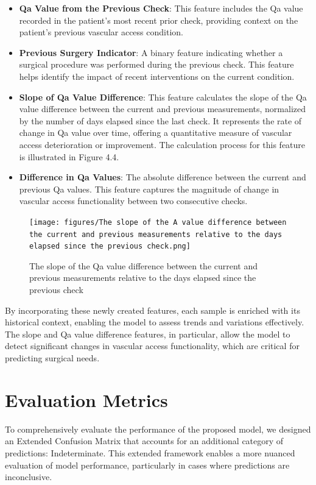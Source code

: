 \begin{itemize}
    \item \textbf{Qa Value from the Previous Check}: This feature includes the Qa value recorded in the patient's most recent prior check, providing context on the patient's previous vascular access condition.
    \item \textbf{Previous Surgery Indicator}: A binary feature indicating whether a surgical procedure was performed during the previous check. This feature helps identify the impact of recent interventions on the current condition.
    \item \textbf{Slope of Qa Value Difference}: This feature calculates the slope of the Qa value difference between the current and previous measurements, normalized by the number of days elapsed since the last check. It represents the rate of change in Qa value over time, offering a quantitative measure of vascular access deterioration or improvement. The calculation process for this feature is illustrated in Figure 4.4.
    \item \textbf{Difference in Qa Values}: The absolute difference between the current and previous Qa values. This feature captures the magnitude of change in vascular access functionality between two consecutive checks.
\end{itemize}

\begin{figure}[H]
    \centering
    \texttt{[image: figures/The slope of the A value difference between the current and previous measurements relative to the days elapsed since the previous check.png]}
    \caption{The slope of the Qa value difference between the current and previous measurements relative to the days elapsed since the previous check}
    \label{fig:enter-label}
\end{figure}

By incorporating these newly created features, each sample is enriched with its historical context, enabling the model to assess trends and variations effectively. The slope and Qa value difference features, in particular, allow the model to detect significant changes in vascular access functionality, which are critical for predicting surgical needs.
\newpage
\section{Evaluation Metrics}

To comprehensively evaluate the performance of the proposed model, we designed an Extended Confusion Matrix that accounts for an additional category of predictions: Indeterminate. This extended framework enables a more nuanced evaluation of model performance, particularly in cases where predictions are inconclusive.

